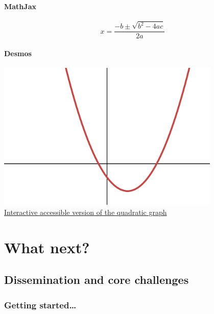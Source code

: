 \documentclass[
  letterpaper,
  DIV=11,
  numbers=noendperiod]{scrartcl}
\let\oldparagraph\paragraph
\renewcommand{\paragraph}[1]{\oldparagraph{#1}\mbox{}}
\begin{document}
\paragraph{MathJax}\label{mathjax}

\[
x = \frac{-b \pm \sqrt{b^2-4ac}}{2a}
\]

\paragraph{Desmos}\label{desmos}

\includegraphics[width=0.8\textwidth,height=\textheight]{./images/desmos-quadratic.png}\\
\href{https://www.desmos.com/calculator/34qsxjk2p3}{Interactive
accessible version of the quadratic graph}

\section{What next?}\label{what-next}

\subsection{Dissemination and core
challenges}\label{dissemination-and-core-challenges}

\subsubsection{Getting started\ldots{}}\label{getting-started}
\end{document}

